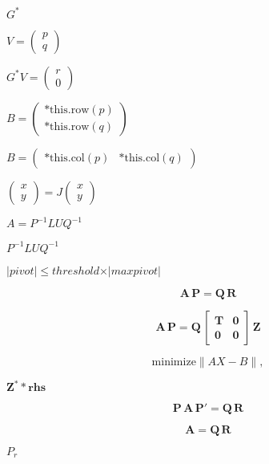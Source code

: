 \documentclass{article}
\begin{document}
$ G^* $
\pagebreak

$ V = \left ( \begin{array}{c} p \\ q \end{array} \right )$
\pagebreak

$ G^* V = \left ( \begin{array}{c} r \\ 0 \end{array} \right )$
\pagebreak

$ B = \left ( \begin{array}{cc} \text{*this.row}(p) \\ \text{*this.row}(q) \end{array} \right ) $
\pagebreak

$ B = \left ( \begin{array}{cc} \text{*this.col}(p) & \text{*this.col}(q) \end{array} \right ) $
\pagebreak

$ \left ( \begin{array}{cc} x \\ y \end{array} \right )  =  J \left ( \begin{array}{cc} x \\ y \end{array} \right ) $
\pagebreak

$ A = P^{-1} L U Q^{-1} $
\pagebreak

$ P^{-1} L U Q^{-1} $
\pagebreak

$ \vert pivot \vert \leqslant threshold \times \vert maxpivot \vert $
\pagebreak

\[
 \mathbf{A} \, \mathbf{P} = \mathbf{Q} \, \mathbf{R}
\]
\pagebreak

\[
 \mathbf{A} \, \mathbf{P} = \mathbf{Q} \,
                    \begin{bmatrix} \mathbf{T} &  \mathbf{0} \\
                                    \mathbf{0} & \mathbf{0} \end{bmatrix} \, \mathbf{Z}
\]
\pagebreak

\[\mathrm{minimize} \|A X - B\|, \]
\pagebreak

$ \mathbf{Z}^* * \mathbf{rhs} $
\pagebreak

\[
 \mathbf{P} \, \mathbf{A} \, \mathbf{P}' = \mathbf{Q} \, \mathbf{R}
\]
\pagebreak

\[
 \mathbf{A} = \mathbf{Q} \, \mathbf{R}
\]
\pagebreak

$ P_r $
\pagebreak
\end{document}
